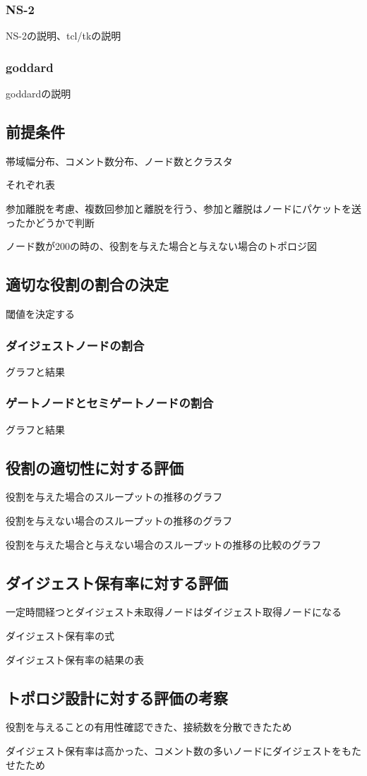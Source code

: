 \subsubsection{NS-2}
NS-2の説明、tcl/tkの説明

\subsubsection{goddard}
goddardの説明

\subsection{前提条件}
帯域幅分布、コメント数分布、ノード数とクラスタ

それぞれ表

参加離脱を考慮、複数回参加と離脱を行う、参加と離脱はノードにパケットを送ったかどうかで判断

ノード数が200の時の、役割を与えた場合と与えない場合のトポロジ図

\subsection{適切な役割の割合の決定}
閾値を決定する

\subsubsection{ダイジェストノードの割合}
グラフと結果

\subsubsection{ゲートノードとセミゲートノードの割合}
グラフと結果

\subsection{役割の適切性に対する評価}
役割を与えた場合のスループットの推移のグラフ

役割を与えない場合のスループットの推移のグラフ

役割を与えた場合と与えない場合のスループットの推移の比較のグラフ

\subsection{ダイジェスト保有率に対する評価}
一定時間経つとダイジェスト未取得ノードはダイジェスト取得ノードになる

ダイジェスト保有率の式

ダイジェスト保有率の結果の表

\subsection{トポロジ設計に対する評価の考察}
役割を与えることの有用性確認できた、接続数を分散できたため

ダイジェスト保有率は高かった、コメント数の多いノードにダイジェストをもたせたため


